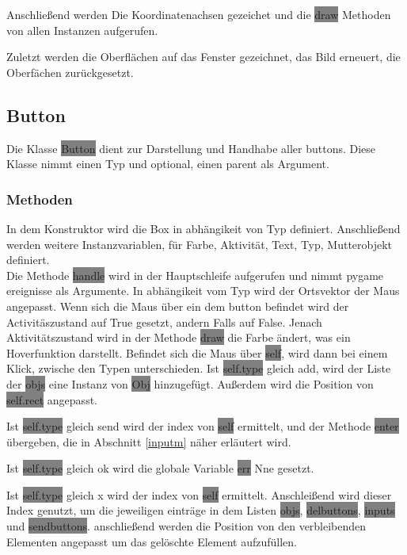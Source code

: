 \documentclass[12pt]{article}
\begin{document}
Anschließend werden Die Koordinatenachsen gezeichet und die \colorbox{gray}{draw} Methoden von allen Instanzen aufgerufen.

Zuletzt werden die Oberflächen auf das Fenster gezeichnet, das Bild erneuert, die Oberfächen zurückgesetzt.
\subsection{Button}
Die Klasse \colorbox{gray}{Button} dient zur Darstellung und Handhabe aller buttons.
Diese Klasse nimmt einen Typ und optional, einen parent als Argument.
\subsubsection{Methoden}
In dem Konstruktor wird die Box in abhängikeit von Typ definiert.
Anschließend werden weitere Instanzvariablen, für Farbe, Aktivität, Text, Typ, Mutterobjekt definiert.
\\

Die Methode \colorbox{gray}{handle} wird in der Hauptschleife aufgerufen und nimmt pygame ereignisse als Argumente.
In abhängikeit vom Typ wird der Ortsvektor der Maus angepasst.
Wenn sich die Maus über ein dem button befindet wird der Activitäszustand auf True gesetzt, andern Falls auf False.
Jenach Aktivitätszustand wird in der Methode \colorbox{gray}{draw} die Farbe ändert, was ein Hoverfunktion darstellt.
Befindet sich die Maus über \colorbox{gray}{self}, wird dann bei einem Klick, zwische den Typen unterschieden.
Ist \colorbox{gray}{self.type} gleich add, wird der Liste der \colorbox{gray}{objs} eine Instanz von \colorbox{gray}{Obj} hinzugefügt.
Außerdem wird die Position von \colorbox{gray}{self.rect} angepasst.

Ist \colorbox{gray}{self.type} gleich send wird der index von \colorbox{gray}{self} ermittelt, und der Methode \colorbox{gray}{enter} übergeben, die in Abschnitt \ref{inputm} näher erläutert wird.

Ist \colorbox{gray}{self.type} gleich ok wird die globale Variable \colorbox{gray}{err} Nne gesetzt.

Ist \colorbox{gray}{self.type} gleich x wird der index von \colorbox{gray}{self} ermittelt.
Anschleißend wird dieser Index genutzt, um die jeweiligen einträge in dem Listen \colorbox{gray}{objs}, \colorbox{gray}{delbuttons}, \colorbox{gray}{inputs} und \colorbox{gray}{sendbuttons}.
anschließend werden die Position von den verbleibenden Elementen angepasst um das gelöschte Element aufzufüllen.
\\
\end{document}

